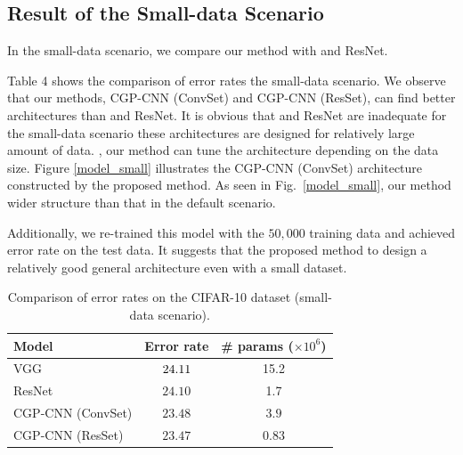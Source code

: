 \subsection{Result of the Small-data Scenario}
In the small-data scenario, we compare our method with  and ResNet.

Table 4 shows the comparison of error rates  the small-data scenario. We observe that our methods, CGP-CNN (ConvSet) and CGP-CNN (ResSet), can find better architectures than  and ResNet.
It is obvious that  and ResNet are inadequate for the small-data scenario  these architectures are designed for  relatively large amount of data. , our method can tune the architecture depending on the data size.
Figure \ref{model_small} illustrates the CGP-CNN (ConvSet) architecture constructed by  the proposed method.
As seen in Fig.~\ref{model_small}, our method  wider structure than that in the default scenario.

Additionally, we  re-trained this model with the $50,000$ training data and achieved   error rate on the test data. It suggests that the proposed method  to design a relatively good general architecture even with a small dataset.


\begin{table}[t]
  \caption{Comparison of error rates on the CIFAR-10 dataset (small-data scenario).}
  \label{results_small}
  \begin{tabular}{l|c|c} \hline
   Model & Error rate & \# params ($\times 10^6$) \\ \hline
   VGG \cite{simonyan_very_2014} & $\nnew{24.11}$ & 15.2 \\
   ResNet \cite{he_deep_2016} & $24.10$ & 1.7 \\ 
   CGP-CNN (ConvSet) & $23.48$  & $3.9$  \\
   CGP-CNN (ResSet) & $23.47$ & $0.83$ \\ \hline
  \end{tabular}
\end{table}


